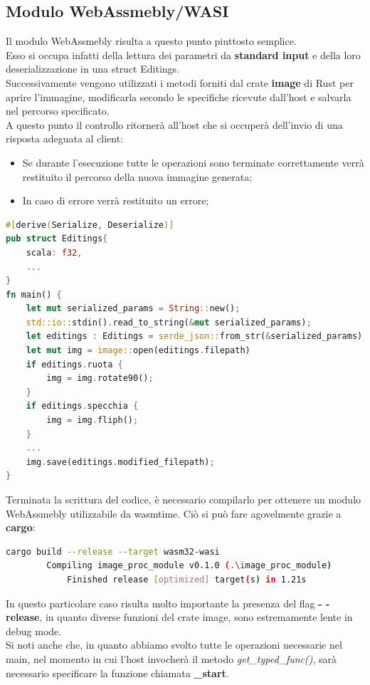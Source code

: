 \subsection{Modulo WebAssmebly/WASI}
Il modulo WebAssmebly risulta a questo punto piuttosto semplice.
\\Esso si occupa infatti della lettura dei parametri da \textbf{standard input} e della loro deserializzazione in una struct Editings.
\\Successivamente vengono utilizzati i metodi forniti dal crate \textbf{image} di Rust per aprire l'immagine, modificarla secondo le specifiche ricevute dall'host e salvarla nel percorso specificato.\cite{rust:image}
\\A questo punto il controllo ritornerà all'host che si occuperà dell'invio di una risposta adeguata al client:
\begin{itemize}
    \item Se durante l'esecuzione tutte le operazioni sono terminate correttamente verrà restituito il percorso della nuova immagine generata;
    \item In caso di errore verrà restituito un errore;
\end{itemize}
\begin{lstlisting}[language=rust, showstringspaces=false]
#[derive(Serialize, Deserialize)]
pub struct Editings{
    scala: f32,
    ...
}
fn main() {
    let mut serialized_params = String::new();
    std::io::stdin().read_to_string(&mut serialized_params);
    let editings : Editings = serde_json::from_str(&serialized_params);
    let mut img = image::open(editings.filepath)
    if editings.ruota {
        img = img.rotate90();
    }
    if editings.specchia {
        img = img.fliph();
    }
    ...
    img.save(editings.modified_filepath);
}
\end{lstlisting}
Terminata la scrittura del codice, è necessario compilarlo per ottenere un modulo WebAssmebly utilizzabile da wasmtime. Ciò si può fare agovelmente grazie a \textbf{cargo}:
\begin{lstlisting}[language=Bash, numbers=none]
cargo build --release --target wasm32-wasi
        Compiling image_proc_module v0.1.0 (.\image_proc_module)
            Finished release [optimized] target(s) in 1.21s
\end{lstlisting}
In questo particolare caso risulta molto importante la presenza del flag \textbf{- - release}, in quanto diverse funzioni del crate image, sono estremamente lente in debug mode.
\\Si noti anche che, in quanto abbiamo svolto tutte le operazioni necessarie nel main, nel momento in cui l'host invocherà il metodo \emph{get\_typed\_func()}, sarà necessario specificare la funzione chiamata \textbf{\_start}.



